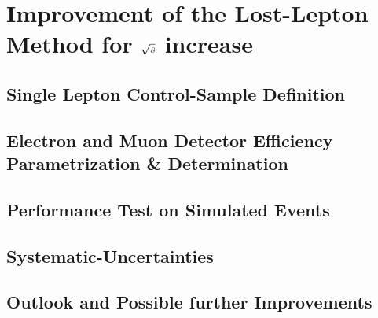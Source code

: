 \section{Improvement of the Lost-Lepton Method for $\sqrt{s}$ increase}
\subsection{Single Lepton Control-Sample Definition}
\label{sec:Lost_Lepton_13TeV_control_sample}
\subsection{Electron and Muon Detector Efficiency Parametrization \& Determination}
\label{sec:Lost_Lepton_13TeV_Efficiencies}
\subsection{Performance Test on Simulated Events}
\label{sec:Lost_Lepton_13TeV_Closure}
\subsection{Systematic-Uncertainties}
\label{sec:Lost_Lepton_13TeV_Uncertainties}
\subsection{Outlook and Possible further Improvements}
\label{sec:Lost_Lepton_13TeV_Outlook}






